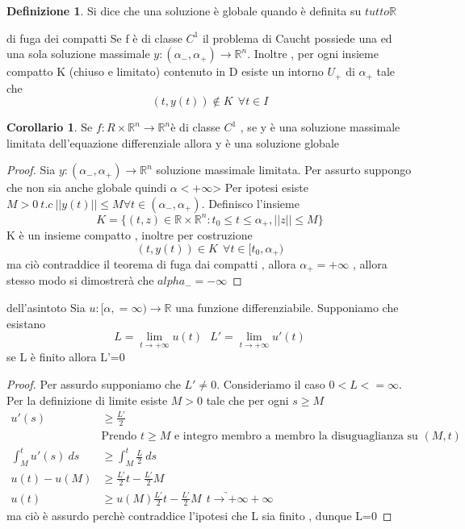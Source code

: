 \documentclass{article}
\theoremstyle{definition}
\newtheorem{definizione}{Definizione}[section]
\newtheorem*{corollario}{Corollario}
\newcommand{\R}{\mathbb{R}}
\newcommand{\Rn}{\R^n}
\begin{document}
		\begin{definizione}
			Si dice che una soluzione è globale quando è definita su $tutto \R$ 
					\end{definizione}
					\begin{teo}{di fuga dei compatti}{}
						Se f è di classe $C^1$ il problema di Caucht possiede una ed una sola soluzione massimale $y:(\alpha_-,\alpha_+)\rightarrow \Rn$. Inoltre , per ogni insieme compatto  K (chiuso e limitato) contenuto in D esiste un intorno $U_+$ di $\alpha_+$ tale che $$(t,y(t))\notin K \ \ \forall t\in I $$
					\end{teo}
					\begin{corollario}
						Se $f:R \times \Rn \rightarrow \Rn$è di classe $C^1$ , se y è una soluzione massimale limitata dell'equazione differenziale allora y è una soluzione globale 
					\end{corollario}
					\begin{proof}
Sia $y:(\alpha_-,\alpha_+)\rightarrow \Rn$ soluzione massimale limitata. Per assurto suppongo che non sia anche  globale quindi $\alpha <  +\infty$> Per ipotesi esiste $M >0 \ t.c \ ||y(t)||\leq M \forall t\in (\alpha_-,\alpha_+)$. Definisco l'insieme 
$$K=\{(t,z)\in \R\times\Rn : t_0\leq t\leq \alpha_+ , ||z||\leq M \}$$ K è un insieme compatto , inoltre per costruzione 
$$(t,y(t))\in K \ \ \forall t \in [t_0,\alpha_+) $$ ma ciò contraddice il teorema di fuga dai compatti , allora $\alpha_+=+\infty$ , allora stesso modo si dimostrerà che $alpha_-=-\infty$ 
					\end{proof}
					\begin{teo}{dell'asintoto}{}
Sia $u:[\alpha,=\infty) \rightarrow \R$ una funzione differenziabile. Supponiamo che esistano 
$$L=\lim_{t\rightarrow +\infty}u(t) \ \ \ L'=\lim_{t\rightarrow +\infty}u'(t)$$ se L è finito allora L'=0
					\end{teo}
					\begin{proof}
Per assurdo supponiamo che $L'\neq 0$. Consideriamo il caso $0<L<=\infty$. Per la definizione di limite esiste $M>0$ tale che per ogni $s\geq M$ 
\begin{align*}
	u'(s)&\geq \frac{L'}{2} \ \\ &\text{Prendo $t\geq M $ e integro membro a membro la disuguaglianza su $(M,t)$ }\\
	\int_{M}^{t}	u'(s)\ ds&\geq\int_{M}^{t} \frac{L}{2} \ ds\\
	u(t)-u(M)& \geq \frac{L'}{2}t - \frac{L'}{2} M \\
	u(t) &\geq u(M)  \frac{L'}{2}t - \frac{L'}{2} M  \ \ \underrightarrow{t \rightarrow +\infty} +\infty
\end{align*}
 ma ciò è assurdo perchè contraddice l'ipotesi che L sia finito , dunque L=0
					\end{proof}
\end{document}
